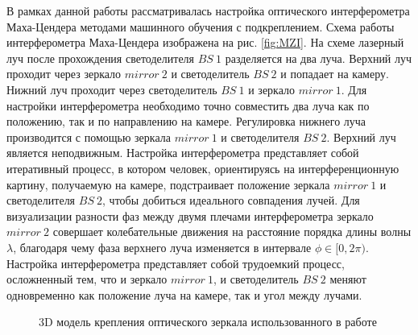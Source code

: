 В рамках данной работы рассматривалась настройка оптического интерферометра Маха-Цендера методами машинного обучения с подкреплением. Схема работы интерферометра Маха-Цендера изображена на рис. \ref{fig:MZI}. На схеме лазерный луч после прохождения светоделителя $BS\ 1$ разделяется на два луча. Верхний луч проходит через зеркало $mirror\ 2$ и светоделитель $BS\ 2$ и попадает на камеру. Нижний луч проходит через светоделитель $BS\ 1$ и зеркало $mirror\ 1$. Для настройки интерферометра необходимо точно совместить два луча как по положению, так и по направлению на камере. Регулировка нижнего луча производится с помощью зеркала $mirror\ 1$ и светоделителя $BS\ 2$. Верхний луч является неподвижным. Настройка интерферометра представляет собой итеративный процесс, в котором человек, ориентируясь на интерференционную картину, получаемую на камере, подстраивает положение зеркала $mirror\ 1$ и светоделителя $BS\ 2$, чтобы добиться идеального совпадения лучей. Для визуализации разности фаз между двумя плечами интерферометра зеркало $mirror\ 2$ совершает колебательные движения на расстояние порядка длины волны $\lambda$, благодаря чему фаза верхнего луча изменяется в интервале $\phi \in [0, 2\pi)$. Настройка интерферометра представляет собой трудоемкий процесс, осложненный тем, что и зеркало $mirror\ 1$, и светоделитель $BS\ 2$ меняют одновременно как положение луча на камере, так и угол между лучами. 

\begin{figure}[ht]
\caption{3D модель крепления оптического зеркала использованного в работе \cite{newport_mirror}}
\label{fig:mirror}
\end{figure}

